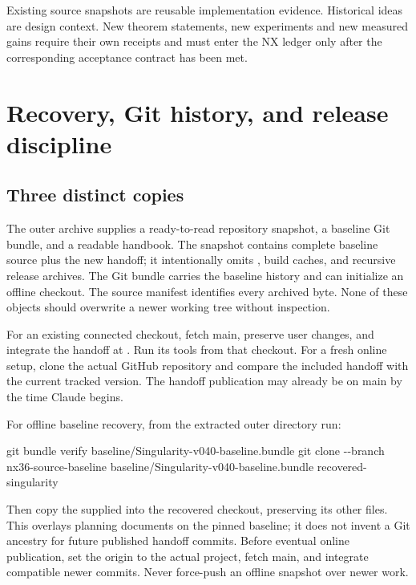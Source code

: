 \documentclass[
  11pt,
  a4paper,
]{report}
\newenvironment{Shaded}{}{}
\newcommand{\AttributeTok}[1]{\textcolor[rgb]{0.49,0.56,0.16}{#1}}
\newcommand{\FunctionTok}[1]{\textcolor[rgb]{0.02,0.16,0.49}{#1}}
\newcommand{\NormalTok}[1]{#1}
\let\nxtexttt\texttt
\renewcommand{\texttt}[1]{\nxtexttt{\seqsplit{#1}}}
\begin{document}
Existing source snapshots are reusable implementation evidence.
Historical ideas are design context. New theorem statements, new
experiments and new measured gains require their own receipts and must
enter the NX ledger only after the corresponding acceptance contract has
been met.

\hypertarget{recovery-git-history-and-release-discipline}{%
\chapter{Recovery, Git history, and release
discipline}\label{recovery-git-history-and-release-discipline}}

\hypertarget{three-distinct-copies}{%
\section{Three distinct copies}\label{three-distinct-copies}}

The outer archive supplies a ready-to-read repository snapshot, a
baseline Git bundle, and a readable handbook. The snapshot contains
complete baseline source plus the new handoff; it intentionally omits
\texttt{.git}, build caches, and recursive release archives. The Git
bundle carries the baseline history and can initialize an offline
checkout. The source manifest identifies every archived byte. None of
these objects should overwrite a newer working tree without inspection.

For an existing connected checkout, fetch main, preserve user changes,
and integrate the handoff at \texttt{handoff/nx36/}. Run its tools from
that checkout. For a fresh online setup, clone the actual GitHub
repository and compare the included handoff with the current tracked
version. The handoff publication may already be on main by the time
Claude begins.

For offline baseline recovery, from the extracted outer directory run:

\begin{Shaded}
\begin{Highlighting}[]
\FunctionTok{git}\NormalTok{ bundle verify baseline/Singularity{-}v040{-}baseline.bundle}
\FunctionTok{git}\NormalTok{ clone }\AttributeTok{{-}{-}branch}\NormalTok{ nx36{-}source{-}baseline baseline/Singularity{-}v040{-}baseline.bundle recovered{-}singularity}
\end{Highlighting}
\end{Shaded}

Then copy the supplied \texttt{repository/handoff/nx36/} into the
recovered checkout, preserving its other files. This overlays planning
documents on the pinned baseline; it does not invent a Git ancestry for
future published handoff commits. Before eventual online publication,
set the origin to the actual project, fetch main, and integrate
compatible newer commits. Never force-push an offline snapshot over
newer work.
\end{document}
